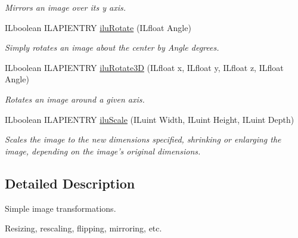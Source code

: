 \begin{DoxyCompactItemize}
\begin{DoxyCompactList}\small\item\em Mirrors an image over its y axis. \end{DoxyCompactList}\item 
I\+Lboolean I\+L\+A\+P\+I\+E\+N\+T\+R\+Y \hyperlink{group__ilu__geometry_gacc794d0e5a6951bb801fb9b278d63215}{ilu\+Rotate} (I\+Lfloat Angle)
\begin{DoxyCompactList}\small\item\em Simply rotates an image about the center by {\itshape Angle} degrees. \end{DoxyCompactList}\item 
I\+Lboolean I\+L\+A\+P\+I\+E\+N\+T\+R\+Y \hyperlink{group__ilu__geometry_gab62dd0f340a7f55455ab4c5a92747f2d}{ilu\+Rotate3\+D} (I\+Lfloat x, I\+Lfloat y, I\+Lfloat z, I\+Lfloat Angle)
\begin{DoxyCompactList}\small\item\em Rotates an image around a given axis. \end{DoxyCompactList}\item 
I\+Lboolean I\+L\+A\+P\+I\+E\+N\+T\+R\+Y \hyperlink{group__ilu__geometry_ga34b36ea94ddcbc730391534ffd497d1d}{ilu\+Scale} (I\+Luint Width, I\+Luint Height, I\+Luint Depth)
\begin{DoxyCompactList}\small\item\em Scales the image to the new dimensions specified, shrinking or enlarging the image, depending on the image's original dimensions. \end{DoxyCompactList}\end{DoxyCompactItemize}


\subsection{Detailed Description}
Simple image transformations. 

Resizing, rescaling, flipping, mirroring, etc. 

